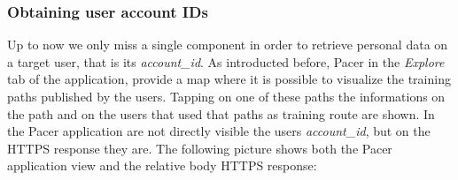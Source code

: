			\subsubsection{Obtaining user account IDs}
				\par Up to now we only miss a single component in order to retrieve personal data on a target user, that is its \textit{account\_id}. As introducted before, Pacer in the \textit{Explore} tab of the application, provide a map where it is possible to visualize the training paths published by the users. Tapping on one of these paths the informations on the path and on the users that used that paths as training route are shown. In the Pacer application are not directly visible the users \textit{account\_id}, but on the HTTPS response they are. The following picture shows both the Pacer application view and the relative body HTTPS response:\newpage
